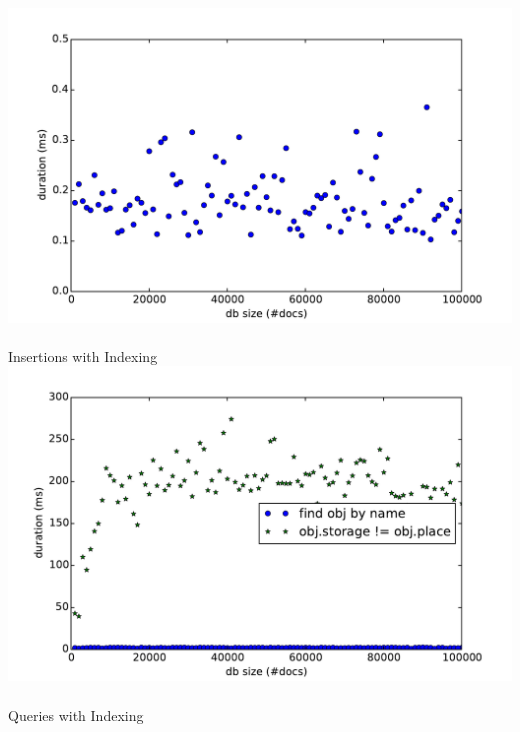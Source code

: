 \begin{frame}
\begin{columns}
\begin{column}{0.55\textwidth}
  \centering
    \small
    \\\vspace{-0.15cm}
    \includegraphics[width=\textwidth]{../thesis/plots/insert-durations-index}\\
    \\\vspace{-0.05cm}
    Insertions with Indexing
    \\\vspace{-0.08cm}
    \includegraphics[width=\textwidth]{../thesis/plots/query-durations-index}\\
    \\\vspace{-0.05cm}
    Queries with Indexing
    \end{column}
  \end{columns}
\end{frame}

